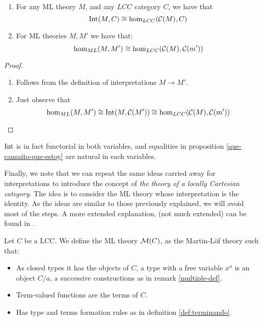 \begin{definition}
\begin{proposition}\label{que-cansaito-que-estoy}
  \begin{enumerate}
  \item For any ML theory $M$, and any $LCC$ category $C$, we have that
    $$  \operatorname{Int} (M,C) \cong \hom_{LCC} (\mathcal{C}(M), C)$$
  \item For ML theories $M,M'$ we have that:
    $$ \hom_{ML}(M,M') \cong \hom_{LCC}(\mathcal{C}(M),\mathcal{C}(m'))$$
  \end{enumerate}
\end{proposition}
\begin{proof}
  \begin{enumerate}
  \item Follows from the definition of interpretations $M\to M'$.
  \item Just observe that    $$ \hom_{ML}(M,M') \cong \operatorname{Int}(M, \mathcal{C}(M'))\cong \hom_{LCC}(\mathcal{C}(M),\mathcal{C}(m'))$$
  \end{enumerate}
\end{proof}
\begin{remark}
  $\operatorname{Int}$ is in fact functorial in both variables, and equalities in proposition \ref{que-cansaito-que-estoy} are natural in each variables.
\end{remark}

Finally, we note that we can repeat the same ideas carried away for interpretations  to introduce the concept of \emph{the theory of a locally Cartesian category}. The idea is to consider the ML theory whose interpretation is the identity. As the ideas are similar to those previously explained, we will avoid most of the steps. A more extended explanation, (not much extended) can be found in \cite[Section 5]{seely1984locally}.

\begin{definition}
  Let $C$ be a LCC. We define the ML theory $\mathcal{M} (C)$, as the Martin-L\"of theory such that:
  \begin{itemize}
  \item As closed types it has the objects of $C$, a type with a free variable $x^a$ is an object $C/a$, a successive constructions as in remark \ref{multiple-def}.
  \item Term-valued functions are the terms of $C$.
  \item Has type and terms formation rules as in definition \ref{def:terminando}.
  \end{itemize}
\end{definition}


\end{definition}

